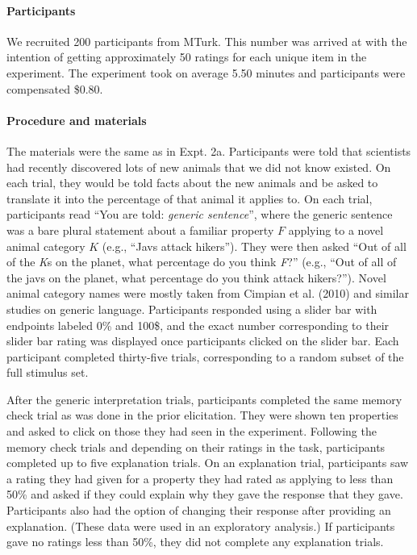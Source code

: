 \documentclass[floatsintext,man]{apa6}
\theoremstyle{definition}
\theoremstyle{definition}
\theoremstyle{definition}
\theoremstyle{remark}
\begin{document}
\paragraph{Participants}\label{participants-3}

We recruited 200 participants from MTurk. This number was arrived at
with the intention of getting approximately 50 ratings for each unique
item in the experiment. The experiment took on average 5.50 minutes and
participants were compensated \$0.80.

\paragraph{Procedure and materials}\label{procedure-and-materials-3}

The materials were the same as in Expt. 2a. Participants were told that
scientists had recently discovered lots of new animals that we did not
know existed. On each trial, they would be told facts about the new
animals and be asked to translate it into the percentage of that animal
it applies to. On each trial, participants read \enquote{You are told:
\emph{generic sentence}}, where the generic sentence was a bare plural
statement about a familiar property \(F\) applying to a novel animal
category \(K\) (e.g., \enquote{Javs attack hikers}). They were then
asked \enquote{Out of all of the \emph{K}s on the planet, what
percentage do you think \emph{F}?} (e.g., \enquote{Out of all of the
javs on the planet, what percentage do you think attack hikers?}). Novel
animal category names were mostly taken from Cimpian et al. (2010) and
similar studies on generic language. Participants responded using a
slider bar with endpoints labeled 0\% and 100\$, and the exact number
corresponding to their slider bar rating was displayed once participants
clicked on the slider bar. Each participant completed thirty-five
trials, corresponding to a random subset of the full stimulus set.

After the generic interpretation trials, participants completed the same
memory check trial as was done in the prior elicitation. They were shown
ten properties and asked to click on those they had seen in the
experiment. Following the memory check trials and depending on their
ratings in the task, participants completed up to five explanation
trials. On an explanation trial, participants saw a rating they had
given for a property they had rated as applying to less than 50\% and
asked if they could explain why they gave the response that they gave.
Participants also had the option of changing their response after
providing an explanation. (These data were used in an exploratory
analysis.) If participants gave no ratings less than 50\%, they did not
complete any explanation trials.
\end{document}
